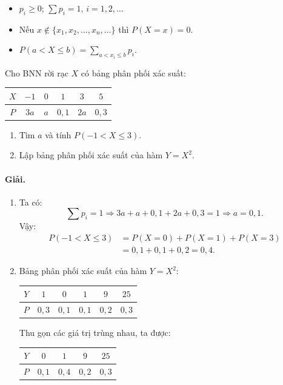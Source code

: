 \begin{chuy}
\begin{itemize}
    \item $p_i \ge 0$; $\sum p_i = 1$, $i = 1, 2, \dots$
    \item Nếu $x \notin \{x_1, x_2, \dots, x_n, \dots\}$ thì $P(X = x) = 0$.
    \item $P(a < X \le b) = \displaystyle\sum_{a < x_i \le b} p_i$.
\end{itemize}
\end{chuy}

\begin{vidu}[VD 2]
Cho BNN rời rạc $X$ có bảng phân phối xác suất:
\begin{center}
\begin{tabular}{|c|c|c|c|c|c|}
\hline
$X$ & $-1$ & $0$ & $1$ & $3$ & $5$ \\
\hline
$P$ & $3a$ & $a$ & $0{,}1$ & $2a$ & $0{,}3$ \\
\hline
\end{tabular}
\end{center}
\begin{enumerate}[label=\arabic*)]
    \item Tìm $a$ và tính $P(-1 < X \le 3)$.
    \item Lập bảng phân phối xác suất của hàm $Y = X^2$.
\end{enumerate}

\paragraph{Giải.}
\begin{enumerate}[label=\arabic*)]
    \item Ta có:
    \[
    \sum p_i = 1 \Rightarrow 3a + a + 0{,}1 + 2a + 0{,}3 = 1 \Rightarrow a = 0{,}1.
    \]
    Vậy:
    \begin{align*}
    P(-1 < X \le 3) &= P(X = 0) + P(X = 1) + P(X = 3) \\
    &= 0{,}1 + 0{,}1 + 0{,}2 = 0{,}4.
    \end{align*}
    \item Bảng phân phối xác suất của hàm $Y = X^2$:
    \begin{center}
    \begin{tabular}{|c|c|c|c|c|c|}
    \hline
    $Y$ & $1$ & $0$ & $1$ & $9$ & $25$ \\
    \hline
    $P$ & $0{,}3$ & $0{,}1$ & $0{,}1$ & $0{,}2$ & $0{,}3$ \\
    \hline
    \end{tabular}
    \end{center}
    Thu gọn các giá trị trùng nhau, ta được:
    \begin{center}
    \begin{tabular}{|c|c|c|c|c|}
    \hline
    $Y$ & $0$ & $1$ & $9$ & $25$ \\
    \hline
    $P$ & $0{,}1$ & $0{,}4$ & $0{,}2$ & $0{,}3$ \\
    \hline
    \end{tabular}
    \end{center}
\end{enumerate}
\end{vidu}

